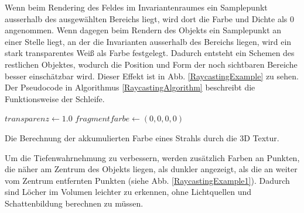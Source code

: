 \documentclass[a4paper,fontsize=12pt,toc=bib,halfparskip]{scrartcl}
\begin{document}
Wenn beim Rendering des Feldes im Invariantenraumes ein Samplepunkt ausserhalb des ausgew\"ahlten Bereichs liegt, wird dort die Farbe und Dichte als 0 angenommen. Wenn dagegen beim Rendern des Objekts ein Samplepunkt an einer Stelle liegt, an der die Invarianten ausserhalb des Bereichs liegen, wird ein stark transparentes Wei{\ss} als Farbe festgelegt. Dadurch entsteht ein Schemen des restlichen Objektes, wodurch die Position und Form der noch sichtbaren Bereiche besser einsch\"atzbar wird. Dieser Effekt ist in Abb. \ref{RaycastingExample} zu sehen. Der Pseudocode in Algorithmus \ref{RaycastingAlgorithm} beschreibt die Funktionsweise der Schleife.

\begin{algorithm}[t]
	$transparenz\gets 1.0$\;
	$fragmentfarbe\gets (0, 0, 0, 0)$\;
	\vspace{0.5cm}
	\caption{Die Berechnung der akkumulierten Farbe eines Strahls durch die 3D Textur.}
	\label{RaycastingAlgorithm}
\end{algorithm}

Um die Tiefenwahrnehmung zu verbessern, werden zus\"atzlich Farben an Punkten, die n\"aher am Zentrum des Objekts liegen, als dunkler angezeigt, als die an weiter vom Zentrum entfernten Punkten (siehe Abb. \ref{RaycastingExample1}). Dadurch sind L\"ocher im Volumen leichter zu erkennen, ohne Lichtquellen und Schattenbildung berechnen zu m\"ussen.
\end{document}
